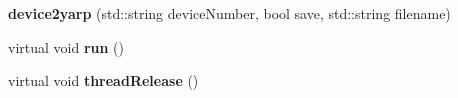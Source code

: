 \begin{DoxyCompactItemize}
\item 
{\bfseries device2yarp} (std\+::string device\+Number, bool save, std\+::string filename)\hypertarget{classdevice2yarp_a2871ae4aafa163197e3991486d3c8b18}{}\label{classdevice2yarp_a2871ae4aafa163197e3991486d3c8b18}

\item 
virtual void {\bfseries run} ()\hypertarget{classdevice2yarp_aa01eb91fc90a62cb29df3fdc8387cb54}{}\label{classdevice2yarp_aa01eb91fc90a62cb29df3fdc8387cb54}

\item 
virtual void {\bfseries thread\+Release} ()\hypertarget{classdevice2yarp_ae429ee3f9ab68ceea96daf63553e7700}{}\label{classdevice2yarp_ae429ee3f9ab68ceea96daf63553e7700}


\end{DoxyCompactItemize}
